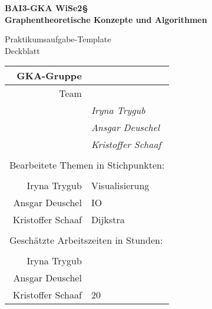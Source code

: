 

\thispagestyle{empty}
\begin{center}

    {\large {\bf   BAI3-GKA WiSe2§ \\ Graphentheoretische Konzepte und Algorithmen \\[5mm]} }
    
{\huge Praktikumsaufgabe-Template  \\[5mm] Deckblatt}\\

\end{center}

				\begin{tabular}[t]{|r|l|}
				 \hline
				GKA-Gruppe&                 \raisebox{-3mm}{\rule[8mm]{100mm}{0mm} }\\ \hline    
				Team &                                                        \\ \hline			
				& \textit{Iryna Trygub }               \\ \hline    
				& \textit{Ansgar Deuschel }               \\ \hline			
				& \textit{Kristoffer Schaaf }             \\ \hline  			
				\multicolumn{2}{c}{}\\  			
				\multicolumn{2}{l}{Bearbeitete Themen in Stichpunkten:}\\			
				\multicolumn{2}{c}{}\\  \hline
				Iryna Trygub & Visualisierung               \\ \hline    
				Ansgar Deuschel& IO                 \\ \hline			
				Kristoffer Schaaf& Dijkstra                \\ \hline 		
				\multicolumn{2}{c}{}\\  			
				\multicolumn{2}{l}{Geschätzte Arbeitszeiten in Stunden:}\\			
				\multicolumn{2}{c}{}\\  \hline
				Iryna Trygub &                 \\ \hline    
				Ansgar Deuschel&                  \\ \hline			
				Kristoffer Schaaf& 20                \\ \hline 			
				\end{tabular}
~\\[4mm]
		
		
\vfill

